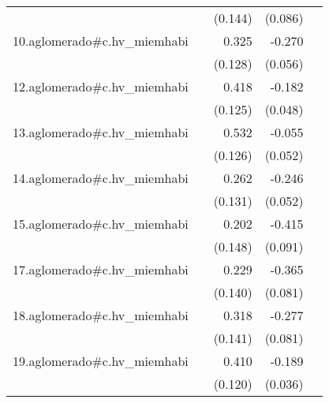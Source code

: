 {\begin{longtable}{l*{4}{D{.}{.}{-1}}}
            &                     &     (0.144)         &     (0.086)         &                     \\
\addlinespace
10.aglomerado#c.hv\_miemhabi&                     &       0.325\sym{*}  &      -0.270\sym{***}&                     \\
            &                     &     (0.128)         &     (0.056)         &                     \\
\addlinespace
12.aglomerado#c.hv\_miemhabi&                     &       0.418\sym{***}&      -0.182\sym{***}&                     \\
            &                     &     (0.125)         &     (0.048)         &                     \\
\addlinespace
13.aglomerado#c.hv\_miemhabi&                     &       0.532\sym{***}&      -0.055         &                     \\
            &                     &     (0.126)         &     (0.052)         &                     \\
\addlinespace
14.aglomerado#c.hv\_miemhabi&                     &       0.262\sym{*}  &      -0.246\sym{***}&                     \\
            &                     &     (0.131)         &     (0.052)         &                     \\
\addlinespace
15.aglomerado#c.hv\_miemhabi&                     &       0.202         &      -0.415\sym{***}&                     \\
            &                     &     (0.148)         &     (0.091)         &                     \\
\addlinespace
17.aglomerado#c.hv\_miemhabi&                     &       0.229         &      -0.365\sym{***}&                     \\
            &                     &     (0.140)         &     (0.081)         &                     \\
\addlinespace
18.aglomerado#c.hv\_miemhabi&                     &       0.318\sym{*}  &      -0.277\sym{***}&                     \\
            &                     &     (0.141)         &     (0.081)         &                     \\
\addlinespace
19.aglomerado#c.hv\_miemhabi&                     &       0.410\sym{***}&      -0.189\sym{***}&                     \\
            &                     &     (0.120)         &     (0.036)         &                     \\

\end{longtable}}
